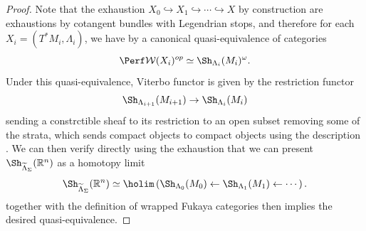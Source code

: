 \begin{proof}
    Note that the exhaustion $X_0\hookrightarrow X_1\hookrightarrow\dotsb\hookrightarrow X$ by construction are exhaustions by cotangent bundles with Legendrian stops, and therefore for each $X_i=(T^{\ast} M_i,\Lambda_i)$, we have by \cite{GPS24M} a canonical quasi-equivalence of categories \[
        \Perf\mathcal{W} (X_i)^{op}\simeq\Sh_{\Lambda_i} (M_i)^{\omega}.
    \]Under this quasi-equivalence, Viterbo functor is given by the restriction functor \[
    \Sh_{\Lambda_{i+1}} (M_{i+1})\to\Sh_{\Lambda_i} (M_i)
    \]sending a constrctible sheaf to its restriction to an open subset removing some of the strata, which sends compact objects to compact objects using the description \cite[Lemma 4.18]{GPS24M}.
    We can then verify directly using the exhaustion that we can present $\Sh_{\widetilde{\Lambda}_{\Sigma}} (\mathbb{R}^n)$ as a homotopy limit \[
        \Sh_{\widetilde{\Lambda}_{\Sigma}} (\mathbb{R}^n)\simeq\holim\left(\Sh_{\Lambda_0} (M_0)\leftarrow\Sh_{\Lambda_1} (M_1)\leftarrow\dotsb\right).
    \]\cite[Proposition 4.20]{GPS24M} together with the definition of wrapped Fukaya categories then implies the desired quasi-equivalence.
\end{proof}
